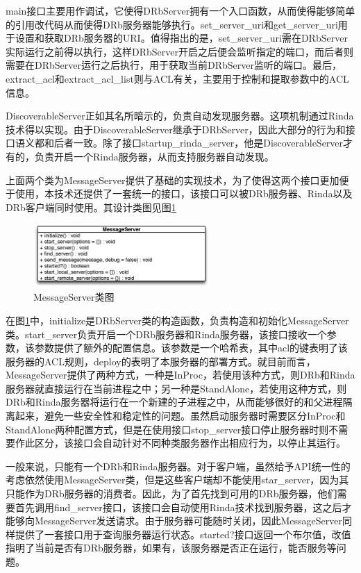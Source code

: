 main接口主要用作调试，它使得DRbServer拥有一个入口函数，从而使得能够简单的引用改代码从而使得DRb服务器能够执行。set\_server\_uri和get\_server\_uri用于设置和获取DRb服务器的URI。值得指出的是，set\_server\_uri需在DRbServer实际运行之前得以执行，这样DRbServer开启之后便会监听指定的端口，而后者则需要在DRbServer运行之后执行，用于获取当前DRbServer监听的端口。最后，extract\_acl和extract\_acl\_list则与ACL有关，主要用于控制和提取参数中的ACL信息。

DiscoverableServer正如其名所暗示的，负责自动发现服务器。这项机制通过Rinda技术得以实现。由于DiscoverableServer继承于DRbServer，因此大部分的行为和接口语义都和后者一致。除了接口startup\_rinda\_server，他是DiscoverableServer才有的，负责开启一个Rinda服务器，从而支持服务器自动发现。

上面两个类为MessageServer提供了基础的实现技术，为了使得这两个接口更加便于使用，本技术还提供了一套统一的接口，该接口可以被DRb服务器、Rinda以及DRb客户端同时使用。其设计类图见图\ref{fig-msg-server-class}

\begin{figure}[h]
\centering
\includegraphics[width=0.6\textwidth]{images/detail/message_bus_class.eps}
\caption{MessageServer类图}
\label{fig-msg-server-class}
\end{figure}

在图\ref{fig-msg-server-class}中，initialize是DRbServer类的构造函数，负责构造和初始化MessageServer类。start\_server负责开启一个DRb服务器和Rinda服务器，该接口接收一个参数，该参数提供了额外的配置信息。该参数是一个哈希表，其中acl的键表明了该服务器的ACL规则，deploy的表明了本服务器的部署方式。就目前而言，MessageServer提供了两种方式，一种是InProc，若使用该种方式，则DRb和Rinda服务器就直接运行在当前进程之中；另一种是StandAlone，若使用这种方式，则DRb和Rinda服务器将运行在一个新建的子进程之中，从而能够很好的和父进程隔离起来，避免一些安全性和稳定性的问题。虽然启动服务器时需要区分InProc和StandAlone两种配置方式，但是在使用接口stop\_server接口停止服务器时则不需要作此区分，该接口会自动针对不同种类服务器作出相应行为，以停止其运行。

一般来说，只能有一个DRb和Rinda服务器。对于客户端，虽然给予API统一性的考虑依然使用MessageServer类，但是这些客户端却不能使用star\_server，因为其只能作为DRb服务器的消费者。因此，为了首先找到可用的DRb服务器，他们需要首先调用find\_server接口，该接口会自动使用Rinda技术找到服务器，这之后才能够向MessageServer发送请求。由于服务器可能随时关闭，因此MessageServer同样提供了一套接口用于查询服务器运行状态。started?接口返回一个布尔值，改值指明了当前是否有DRb服务器，如果有，该服务器是否正在运行，能否服务等问题。

